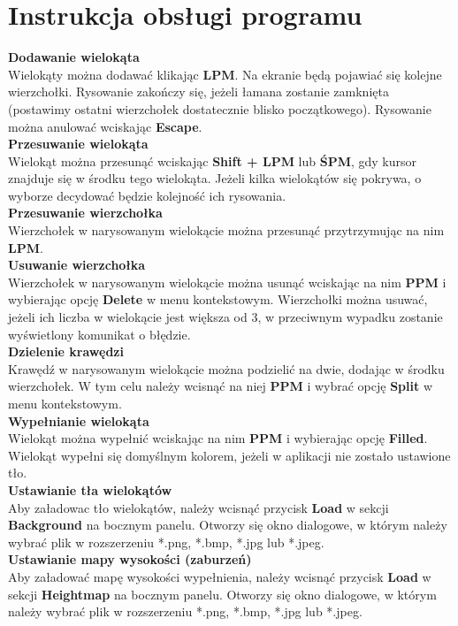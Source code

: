 \documentclass[12pt]{article}
\begin{document}
\section{Instrukcja obsługi programu}
\textbf{Dodawanie wielokąta}\\Wielokąty można dodawać klikając \textbf{LPM}. Na ekranie będą pojawiać się kolejne wierzchołki. Rysowanie zakończy się, jeżeli łamana zostanie zamknięta (postawimy ostatni wierzchołek dostatecznie blisko początkowego). Rysowanie można anulować wciskając \textbf{Escape}.\\[\baselineskip]
\textbf{Przesuwanie wielokąta}\\Wielokąt można przesunąć wciskając \textbf{Shift + LPM} lub \textbf{ŚPM}, gdy kursor znajduje się w środku tego wielokąta. Jeżeli kilka wielokątów się pokrywa, o wyborze decydować będzie kolejność ich rysowania.\\[\baselineskip]
\textbf{Przesuwanie wierzchołka}\\Wierzchołek w narysowanym wielokącie można przesunąć przytrzymując na nim \textbf{LPM}.\\[\baselineskip]
\textbf{Usuwanie wierzchołka}\\Wierzchołek w narysowanym wielokącie można usunąć wciskając na nim \textbf{PPM} i wybierając opcję \textbf{Delete} w menu kontekstowym. Wierzchołki można usuwać, jeżeli ich liczba w wielokącie jest większa od 3, w przeciwnym wypadku zostanie wyświetlony komunikat o błędzie.\\[\baselineskip]
\textbf{Dzielenie krawędzi}\\Krawędź w narysowanym wielokącie można podzielić na dwie, dodając w środku wierzchołek. W tym celu należy wcisnąć na niej \textbf{PPM} i wybrać opcję \textbf{Split} w menu kontekstowym.\\[\baselineskip]
\textbf{Wypełnianie wielokąta}\\Wielokąt można wypełnić wciskając na nim \textbf{PPM} i wybierając opcję \textbf{Filled}. Wielokąt wypełni się domyślnym kolorem, jeżeli w aplikacji nie zostało ustawione tło.\\[\baselineskip]
\textbf{Ustawianie tła wielokątów}\\Aby załadowac tło wielokątów, należy wcisnąć przycisk \textbf{Load} w sekcji \textbf{Background} na bocznym panelu. Otworzy się okno dialogowe, w którym należy wybrać plik w rozszerzeniu *.png, *.bmp, *.jpg lub *.jpeg.\\[\baselineskip]
\textbf{Ustawianie mapy wysokości (zaburzeń)}\\Aby załadować mapę wysokości wypełnienia, należy wcisnąć przycisk \textbf{Load} w sekcji \textbf{Heightmap} na bocznym panelu. Otworzy się okno dialogowe, w którym należy wybrać plik w rozszerzeniu *.png, *.bmp, *.jpg lub *.jpeg.\\[\baselineskip]
\end{document}
